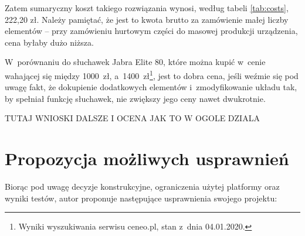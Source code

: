Zatem sumaryczny koszt takiego rozwiązania wynosi, według tabeli \ref{tab:costs}, 222,20 zł. Należy pamiętać, że jest to kwota brutto za zamówienie małej liczby elementów -- przy zamówieniu hurtowym części do masowej produkcji urządzenia, cena byłaby dużo niższa.

W~porównaniu do słuchawek Jabra Elite 80, które można kupić w~cenie wahającej się między 1000~zł, a~1400~zł\footnote{Wyniki wyszukiwania serwisu ceneo.pl, stan z~dnia 04.01.2020.}, jest to dobra cena, jeśli weźmie się pod uwagę fakt, że dokupienie dodatkowych elementów i~zmodyfikowanie układu tak, by spełniał funkcję słuchawek, nie zwiększy jego ceny nawet dwukrotnie.

TUTAJ WNIOSKI DALSZE I OCENA JAK TO W OGOLE DZIALA
\section{Propozycja możliwych usprawnień}
Biorąc pod uwagę decyzje konstrukcyjne, ograniczenia użytej platformy oraz wyniki testów, autor proponuje następujące usprawnienia swojego projektu:
